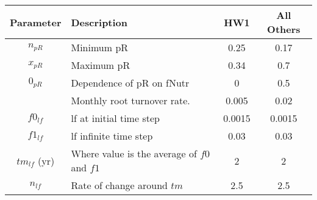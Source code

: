 \begin{tabularx}{\linewidth}{|cXcc|}
\hline
Parameter & Description & HW1 & All Others\\
\hline
 $n_{pR}$ & Minimum \acf{pR} & 0.25 & 0.17\\
 $x_{pR}$ & Maximum \ac{pR} & 0.34 & 0.7\\
 $0_{pR}$ & Dependence of \ac{pR} on \ac{fNutr}  & 0 &  0.5\\
         & Monthly root turnover rate. & 0.005 & 0.02\\
  $f0_{lf}$ & \acf{lf} at initial time step & 0.0015 & 0.0015\\
  $f1_{lf}$ & \ac{lf} infinite time step & 0.03 & 0.03\\
  $tm_{lf}$ (yr) & Where value is the average of $f0$ and $f1$ & 2 &2 \\
  $n_{lf}$  & Rate of change around $tm$ & 2.5 & 2.5\\
 \hline
\end{tabularx}

